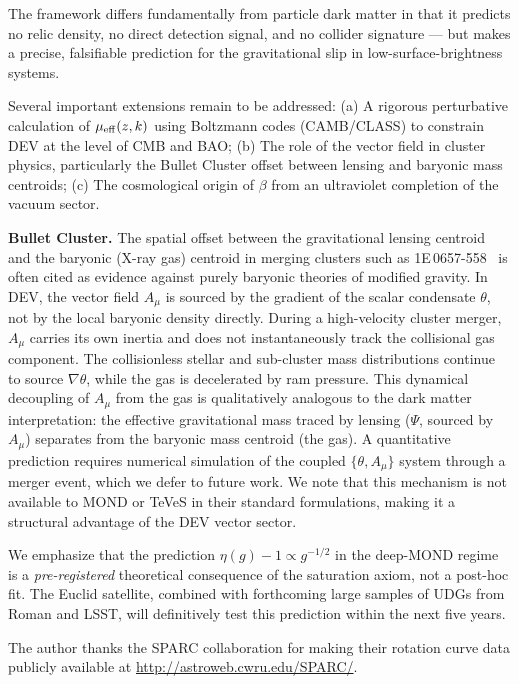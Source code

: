 \documentclass[aps,prd,twocolumn,showpacs,superscriptaddress]{revtex4-2}
\newcommand{\mueff}{\mu_{\rm eff}}
\begin{document}
The framework differs fundamentally from particle dark matter
in that it predicts no relic density, no direct detection signal,
and no collider signature — but makes a precise, falsifiable
prediction for the gravitational slip in low-surface-brightness systems.

Several important extensions remain to be addressed:
(a) A rigorous perturbative calculation of $\mueff(z,k)$
    using Boltzmann codes (CAMB/CLASS) to constrain DEV at the
    level of CMB and BAO;
(b) The role of the vector field in cluster physics,
    particularly the Bullet Cluster offset between lensing
    and baryonic mass centroids;
(c) The cosmological origin of $\beta$ from an ultraviolet
    completion of the vacuum sector.

\textbf{Bullet Cluster.}
The spatial offset between the gravitational lensing centroid
and the baryonic (X-ray gas) centroid in merging clusters
such as 1E\,0657-558~\cite{Clowe2006} is often cited as
evidence against purely baryonic theories of modified gravity.
In DEV, the vector field $A_\mu$ is sourced by the gradient
of the scalar condensate $\theta$, not by the local baryonic
density directly.
During a high-velocity cluster merger, $A_\mu$ carries
its own inertia and does not instantaneously track the
collisional gas component.
The collisionless stellar and sub-cluster mass distributions
continue to source $\nabla\theta$, while the gas
is decelerated by ram pressure.
This dynamical decoupling of $A_\mu$ from the gas is
qualitatively analogous to the dark matter interpretation:
the effective gravitational mass traced by lensing
($\Psi$, sourced by $A_\mu$) separates from the baryonic
mass centroid (the gas).
A quantitative prediction requires numerical simulation
of the coupled $\{\theta, A_\mu\}$ system through a merger
event, which we defer to future work.
We note that this mechanism is not available to
MOND or TeVeS in their standard formulations,
making it a structural advantage of the DEV vector sector.

We emphasize that the prediction $\eta(g) - 1 \propto g^{-1/2}$
in the deep-MOND regime is a \emph{pre-registered} theoretical
consequence of the saturation axiom, not a post-hoc fit.
The Euclid satellite, combined with forthcoming large samples of
UDGs from Roman and LSST, will definitively test this prediction
within the next five years.

\begin{acknowledgments}
The author thanks the SPARC collaboration for making
their rotation curve data publicly available at
\url{http://astroweb.cwru.edu/SPARC/}.
\end{acknowledgments}
\end{document}
